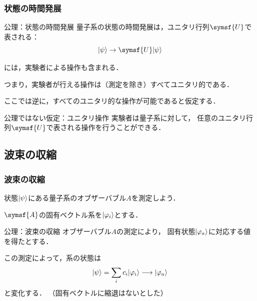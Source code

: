 \documentclass[
    10pt,
    ]{sotsu-beamer}
\begin{document}
\begin{frame}
    \frametitle{状態の時間発展}

    \begin{block}{公理：状態の時間発展}
        量子系の状態の時間発展は，ユニタリ行列$\symsf{U}$で表される：
        \begin{equation*}
            \ket{\psi} \to \symsf{U} \ket{\psi}
        \end{equation*}
    \end{block}

    には，実験者による操作も含まれる．

    つまり，実験者が行える操作は（測定を除き）すべてユニタリ的である．

    \pause

    ここでは逆に，すべてのユニタリ的な操作が可能であると\alert{仮定}する．

    \begin{block}{公理ではない仮定：ユニタリ操作}
        実験者は量子系に対して，
        任意のユニタリ行列$\symsf{U}$で表される操作を行うことができる．
    \end{block}

\end{frame}


\subsection{波束の収縮}


\begin{frame}
    \frametitle{波束の収縮}

    状態$\ket{\psi}$にある量子系のオブザーバブル$A$を測定しよう．

    $\symsf{A}$の固有ベクトル系を$\ket{\varphi_i}$とする．

    \begin{block}{公理：波束の収縮}
        オブザーバブル$A$の測定により，
        固有状態$\ket{\varphi_a}$に対応する値を得たとする．
    
        この測定によって，系の状態は
        \begin{equation*}
            \ket{\psi} = \sum_i c_i \ket{\varphi_i}
                \longrightarrow \ket{\varphi_a}
        \end{equation*}
        と変化する．
        （固有ベクトルに縮退はないとした）
    \end{block}

\end{frame}
\end{document}
